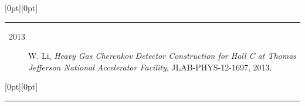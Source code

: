 \documentclass[letterpaper,12pt]{letter}
\begin{document}
\vspace{-8mm}
\raisebox{0pt}[0pt][0pt]{\large\textbf{\raisebox{-3.5ex}{Thesis}}} 
\\[2mm]
\rule[-0.3cm]{4cm}{1pt}

\begin{description}
\item[~2013] \textrm{\normalsize W. Li, \emph{ Heavy Gas Cherenkov Detector Construction for Hall C at Thomas Jefferson National Accelerator Facility}, JLAB-PHYS-12-1697, 2013. }
\end{description}


\secb


\raisebox{0pt}[0pt][0pt]{\Large\textbf{\raisebox{-3.5ex}{Computing Skill}}}
\\[2mm]
\rule[-0.5cm]{10cm}{1pt}

% 
\end{document}
